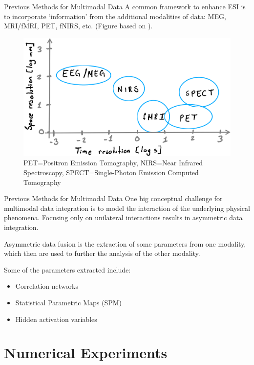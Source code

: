 \documentclass[progressbar=head]{beamer}
\begin{document}
\begin{frame}{Previous Methods for Multimodal Data}
A common framework
to enhance ESI is to incorporate 
`information' from the additional \alert{modalities} of data:
MEG, MRI/fMRI\cite{he2008multimodal, huster2012methods}, PET, fNIRS\cite{fnirs}, etc.
(Figure based on \cite{he2008multimodal}).

\begin{figure}
\centering
\includegraphics[width=0.65\linewidth]{./img_oldbeamer/sketch07}
\caption{PET=Positron Emission Tomography, NIRS=Near Infrared Spectroscopy, SPECT=Single-Photon Emission Computed Tomography}
\end{figure}
\end{frame}

\begin{frame}{Previous Methods for Multimodal Data}
One big conceptual challenge for multimodal data integration is to model the interaction of the underlying physical phenomena. 
%
Focusing only on unilateral interactions results in asymmetric data integration.

\alert{Asymmetric data fusion} is the extraction of some parameters from one modality, which then are used to further the analysis of the other modality.

Some of the parameters extracted include:
\begin{itemize}
    \item Correlation networks
    \item Statistical Parametric Maps (SPM)
    \item Hidden activation variables \cite{fire}
\end{itemize}

\end{frame}

{
\section{Numerical Experiments}
}
\end{document}
